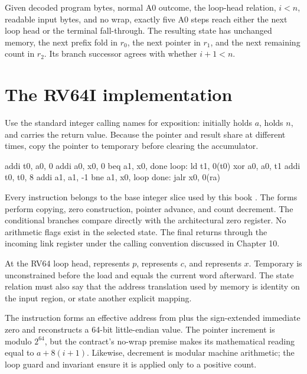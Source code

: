 \begin{proofkit}[title={A0-to-logical body theorem}]
Given decoded program bytes, normal A0 outcome, the loop-head relation,
\(i<n\), readable input bytes, and no wrap, exactly five A0 steps reach either
the next loop head or the terminal fall-through. The resulting state has
unchanged memory, the next prefix fold in \(r_0\), the next pointer in \(r_1\),
and the next remaining count in \(r_2\). Its branch successor agrees with
whether \(i+1<n\).
\end{proofkit}

\section{The RV64I implementation}

Use the standard integer calling names for exposition:  initially
holds \(a\),  holds \(n\), and  carries the return value.
Because the pointer and result share  at different times, copy the
pointer to temporary  before clearing the accumulator.

\begin{codelisting}[language={},caption={RV64I XOR reduction}]
    addi t0, a0, 0
    addi a0, x0, 0
    beq  a1, x0, done
loop:
    ld   t1, 0(t0)
    xor  a0, a0, t1
    addi t0, t0, 8
    addi a1, a1, -1
    bne  a1, x0, loop
done:
    jalr x0, 0(ra)
\end{codelisting}

Every instruction belongs to the base integer slice used by this book
\autocite{riscv2026unpriv}. The
 forms perform copying, zero construction, pointer advance, and
count decrement. The conditional branches compare  directly with
the architectural zero register. No arithmetic flags exist in the selected
state. The final  returns through the incoming link register under
the calling convention discussed in Chapter 10.

At the RV64 loop head,  represents \(p\),  represents
\(c\), and  represents \(x\). Temporary  is unconstrained
before the load and equals the current word afterward. The state relation must
also say that the address translation used by memory is identity on the input
region, or state another explicit mapping.

The instruction  forms an effective address from  plus the
sign-extended immediate zero and reconstructs a 64-bit little-endian value.
The pointer increment is modulo \(2^{64}\), but the contract's no-wrap premise
makes its mathematical reading equal to \(a+8(i+1)\). Likewise, decrement is
modular machine arithmetic; the loop guard and invariant ensure it is applied
only to a positive count.


